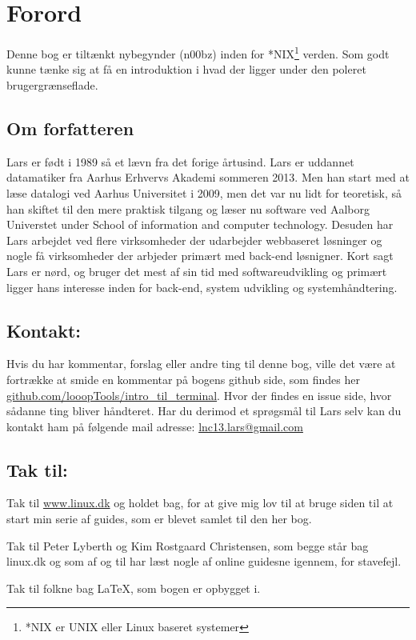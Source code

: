 \chapter*{Forord}
Denne bog er tiltænkt nybegynder (n00bz) inden for *NIX\footnote{*NIX er UNIX eller Linux baseret systemer} verden. 
Som godt kunne tænke sig at få en introduktion i hvad der ligger under den poleret brugergrænseflade. 

\section*{Om forfatteren}
Lars er født i 1989 så et lævn fra det forige årtusind. Lars er uddannet datamatiker fra Aarhus Erhvervs Akademi sommeren 2013. 
Men han start med at læse datalogi ved Aarhus Universitet i 2009, men det var nu lidt for teoretisk, så han skiftet til den mere praktisk 
tilgang og læser nu software ved Aalborg Universtet under School of information and computer technology. Desuden har Lars arbejdet ved flere 
virksomheder der udarbejder webbaseret løsninger og nogle få virksomheder der arbjeder primært med back-end løsnigner. Kort sagt Lars er nørd, 
og bruger det mest af sin tid med softwareudvikling og primært ligger hans interesse inden for back-end, system udvikling og systemhåndtering. 

\section*{Kontakt:}
Hvis du har kommentar, forslag eller andre ting til denne bog, ville det være at fortrække at smide en kommentar på bogens github side, 
som findes her \href{https://github.com/looopTools/intro\_til\_terminal}{github.com/looopTools/intro\_til\_terminal}. Hvor der findes en issue side, 
hvor sådanne ting bliver håndteret. Har du derimod et sprøgsmål til Lars selv kan du kontakt ham på følgende mail adresse: \href{mailto:lnc13.lars@gmail.com}{lnc13.lars@gmail.com}

\section*{Tak til:}
Tak til \href{https://www.linux.dk}{www.linux.dk} og holdet bag, for at give mig 
lov til at bruge siden til at start min serie af guides, som er blevet samlet til den her bog. 
\par Tak til Peter Lyberth og Kim Rostgaard Christensen, som begge står bag linux.dk og som af og til har læst nogle af online guidesne igennem, for stavefejl.
\par Tak til folkne bag \LaTeX, som bogen er opbygget i. 
